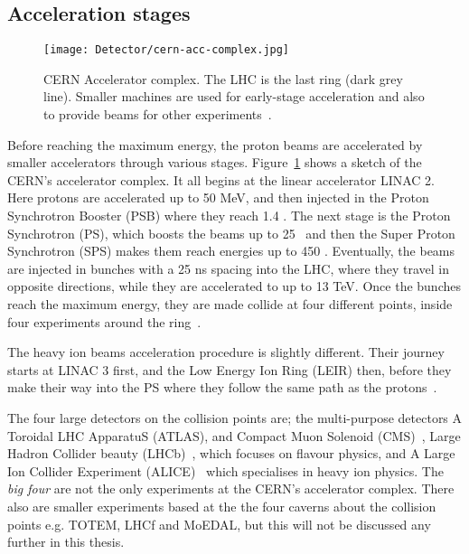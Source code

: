 		\subsection*{Acceleration stages}

			\begin{figure}[!htb]
				\texttt{[image: Detector/cern-acc-complex.jpg]}
				\caption{CERN Accelerator complex. The LHC is the last ring (dark grey line). Smaller machines are used for early-stage acceleration and also to provide beams for other experiments~\cite{Lefevre2008}.}
				\label{fig:cern-acc-complex}
			\end{figure}

			Before reaching the maximum energy, the proton beams are accelerated by smaller accelerators through various stages. Figure~\ref{fig:cern-acc-complex} shows a sketch of the CERN's accelerator complex. It all begins at the linear accelerator LINAC 2. Here protons are accelerated up to 50 MeV, and then injected in the Proton Synchrotron Booster (PSB) where they reach 1.4 \GeV. The next stage is the Proton Synchrotron (PS), which boosts the beams up to 25 \GeV\, and then the Super Proton Synchrotron (SPS) makes them reach energies up to 450 \GeV. Eventually, the beams are injected in bunches with a 25 ns spacing into the LHC, where they travel in opposite directions, while they are accelerated to up to 13 TeV. Once the bunches reach the maximum energy, they are made collide at four different points, inside four experiments around the ring~\cite{LHCDesignReport}. 

			The heavy ion beams acceleration procedure is slightly different. Their journey starts at LINAC 3 first, and the Low Energy Ion Ring (LEIR) then, before they make their way into the PS where they follow the same path as the protons~\cite{LHCDesignReport}. 

			The four large detectors on the collision points are; the multi-purpose detectors A Toroidal LHC ApparatuS (ATLAS), and Compact Muon Solenoid (CMS)~\cite{CMSJINST}, Large Hadron Collider beauty (LHCb)~\cite{LHCb2008}, which focuses on flavour physics, and A Large Ion Collider Experiment (ALICE)~\cite{ALICEJINST} which specialises in heavy ion physics. The \emph{big four} are not the only experiments at the CERN's accelerator complex. There also are smaller experiments based at the the four caverns about the collision points e.g. TOTEM, LHCf and MoEDAL, but this will not be discussed any further in this thesis.
		


